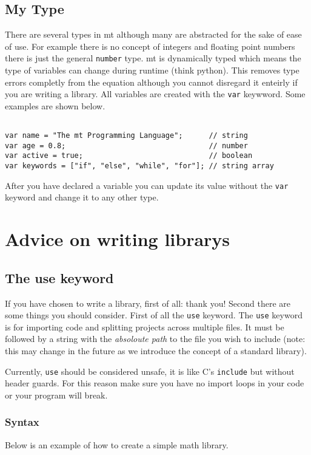 \documentclass{report}
\begin{document}
\section{My Type}
There are several types in mt although many are abstracted for the sake of ease of use. For example there is no concept of integers and floating point numbers there is just the general \texttt{number} type. mt is dynamically typed which means the type of variables can change during runtime (think python). This removes type errors completly from the equation although you cannot disregard it enteirly if you are writing a library. All variables are created with the \texttt{var} keywword. Some examples are shown below.

\begin{lstlisting}

var name = "The mt Programming Language";      // string
var age = 0.8;                                 // number
var active = true;                             // boolean
var keywords = ["if", "else", "while", "for"]; // string array

\end{lstlisting}

After you have declared a variable you can update its value without the \texttt{var} keyword and change it to any other type.

\chapter{Advice on writing librarys}

\section{The use keyword}
If you have chosen to write a library, first of all: thank you! Second there are some things you should consider. First of all the \texttt{use} keyword.
The \texttt{use} keyword is for importing code and splitting projects across multiple files. It must be followed by a string with the \emph{absoloute path} to the file you wish to include (note: this may change in the future as we introduce the concept of a standard library).

Currently, \texttt{use} should be considered unsafe, it is like C's \texttt{include} but without header guards. For this reason make sure you have no import loops in your code or your program will break.

\subsection{Syntax}
Below is an example of how to create a simple math library.
\end{document}
